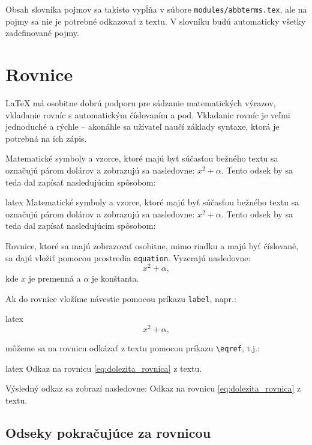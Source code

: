 Obsah slovníka pojmov sa takisto vypĺňa v súbore \texttt{modules/abbterms.tex}, ale na pojmy sa nie je potrebné odkazovať z textu. V slovníku budú automaticky všetky zadefinované pojmy.

\section{Rovnice}

LaTeX má osobitne dobrú podporu pre sádzanie matematických výrazov, vkladanie rovníc s automatickým číslovaním a pod. Vkladanie rovníc je veľmi jednoduché a rýchle -- akonáhle sa užívateľ naučí základy syntaxe, ktorá je potrebná na ich zápis.

Matematické symboly a vzorce, ktoré majú byť súčasťou bežného textu sa označujú párom dolárov a zobrazujú sa nasledovne: $x^2 + \alpha$. Tento odsek by sa teda dal zapísať nasledujúcim spôsobom:
\begin{inlinecode}{latex}
Matematické symboly a vzorce, ktoré majú byť súčasťou bežného
textu sa označujú párom dolárov a zobrazujú sa nasledovne: $x^2 + \alpha$.
Tento odsek by sa teda dal zapísať nasledujúcim spôsobom:
\end{inlinecode}

Rovnice, ktoré sa majú zobrazovať osobitne, mimo riadku a majú byť číslované, sa dajú vložiť pomocou prostredia \texttt{equation}. Vyzerajú nasledovne:
\begin{equation}
x^2 + \alpha,
\label{eq:dolezita_rovnica}
\end{equation}
kde $x$ je premenná a $\alpha$ je konštanta.

Ak do rovnice vložíme návestie pomocou príkazu \texttt{label}, napr.:
\begin{inlinecode}{latex}
\begin{equation}
x^2 + \alpha,
\label{eq:dolezita_rovnica}
\end{equation}
\end{inlinecode}
môžeme sa na rovnicu odkázať z textu pomocou príkazu \texttt{{\textbackslash}eqref}, t.j.:
\begin{inlinecode}{latex}
Odkaz na rovnicu \eqref{eq:dolezita_rovnica} z textu.
\end{inlinecode}

Výsledný odkaz sa zobrazí nasledovne: Odkaz na rovnicu \eqref{eq:dolezita_rovnica} z textu.

\subsection{Odseky pokračujúce za rovnicou}

